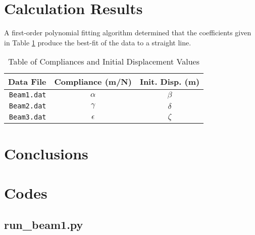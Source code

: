 \documentclass{article}
\begin{document}
\section{Calculation Results}
A first-order polynomial fitting algorithm determined that 
the coefficients given in Table \ref{Coefs} 
produce the best-fit of the data to a straight line.
\begin{table}[h]
\begin{center}
\begin{tabular}{r|c|c}
Data File & Compliance (m/N) & Init. Disp. (m)\\ \hline \hline
\texttt{Beam1.dat} & $\alpha$ & $\beta$ \\ \hline
\texttt{Beam2.dat} & $\gamma$ & $\delta$ \\ \hline
\texttt{Beam3.dat} & $\epsilon$ & $\zeta$ \\ \hline
\end{tabular}
\caption{Table of Compliances and Initial Displacement Values \label{Coefs}}
\end{center}
\end{table}


\section{Conclusions}
\pagebreak

\appendix
\section{Codes}


\lstset{style=python103, language=python} 
\subsection{run\_beam1.py}

\pagebreak %
\end{document}
